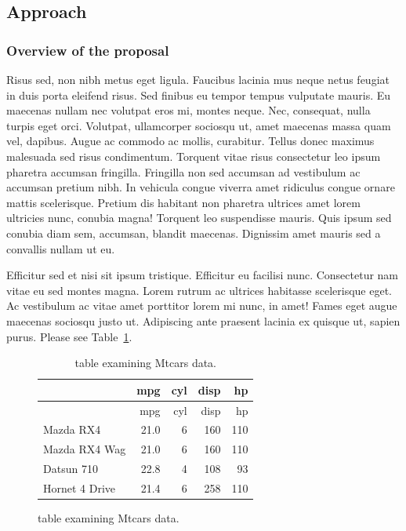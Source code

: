 \documentclass[
  11pt,
  letterpaper,
  DIV=11,
  numbers=noendperiod]{scrartcl}
\begin{document}
\hypertarget{approach}{%
\subsection{Approach}\label{approach}}

\hypertarget{overview-of-the-proposal}{%
\subsubsection{Overview of the
proposal}\label{overview-of-the-proposal}}

Risus sed, non nibh metus eget ligula. Faucibus lacinia mus neque netus
feugiat in duis porta eleifend risus. Sed finibus eu tempor tempus
vulputate mauris. Eu maecenas nullam nec volutpat eros mi, montes neque.
Nec, consequat, nulla turpis eget orci. Volutpat, ullamcorper sociosqu
ut, amet maecenas massa quam vel, dapibus. Augue ac commodo ac mollis,
curabitur. Tellus donec maximus malesuada sed risus condimentum.
Torquent vitae risus consectetur leo ipsum pharetra accumsan fringilla.
Fringilla non sed accumsan ad vestibulum ac accumsan pretium nibh. In
vehicula congue viverra amet ridiculus congue ornare mattis scelerisque.
Pretium dis habitant non pharetra ultrices amet lorem ultricies nunc,
conubia magna! Torquent leo suspendisse mauris. Quis ipsum sed conubia
diam sem, accumsan, blandit maecenas. Dignissim amet mauris sed a
convallis nullam ut eu.

Efficitur sed et nisi sit ipsum tristique. Efficitur eu facilisi nunc.
Consectetur nam vitae eu sed montes magna. Lorem rutrum ac ultrices
habitasse scelerisque eget. Ac vestibulum ac vitae amet porttitor lorem
mi nunc, in amet! Fames eget augue maecenas sociosqu justo ut.
Adipiscing ante praesent lacinia ex quisque ut, sapien purus. Please see
Table~\ref{tbl-mtcars-wrap}.

\begin{figure}

\hypertarget{tbl-mtcars-wrap}{}
\begin{longtable}[]{@{}lrrrr@{}}
\caption{\label{tbl-mtcars-wrap}table examining Mtcars
data.}\tabularnewline
\toprule()
& mpg & cyl & disp & hp \\
\midrule()
\endfirsthead
\toprule()
& mpg & cyl & disp & hp \\
\midrule()
\endhead
Mazda RX4 & 21.0 & 6 & 160 & 110 \\
Mazda RX4 Wag & 21.0 & 6 & 160 & 110 \\
Datsun 710 & 22.8 & 4 & 108 & 93 \\
Hornet 4 Drive & 21.4 & 6 & 258 & 110 \\
\bottomrule()
\end{longtable}

\end{figure}
\end{document}
